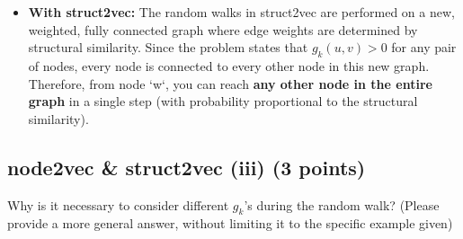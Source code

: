 \documentclass{article}
\numberwithin{figure}{section}
\begin{document}
{\begin{itemize}
			\item \textbf{With struct2vec:} The random walks in struct2vec are performed on a new, weighted, fully connected graph where edge weights are determined by structural similarity. Since the problem states that $g_k(u, v) > 0$ for any pair of nodes, every node is connected to every other node in this new graph. Therefore, from node `w`, you can reach \textbf{any other node in the entire graph} in a single step (with probability proportional to the structural similarity).
		\end{itemize}
	}
	
	\subsection{node2vec \& struct2vec (iii) (3 points)}
	Why is it necessary to consider different $g_k$'s during the random walk?
	(Please provide a more general answer, without limiting it to the specific example given)
\end{document}
